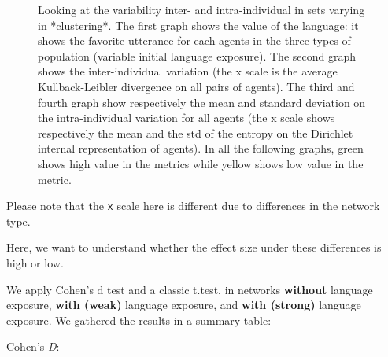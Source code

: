 \documentclass[
]{article}
\begin{document}
\begin{figure}[!H]
\caption{Looking at the variability inter- and intra-individual in sets varying in *clustering*. The first graph shows the value of the language: it shows the favorite utterance for each agents in the three types of population (variable initial language exposure). The second graph shows the  inter-individual variation (the x scale is the average Kullback-Leibler divergence on all pairs of agents). The third and fourth graph show respectively the mean and standard deviation on the intra-individual variation for all agents (the x scale shows respectively the mean and the std of the entropy on the Dirichlet internal representation of agents). In all the following graphs, green shows high value in the metrics while yellow shows low value in the metric.}\label{fig:unnamed-chunk-23}
\end{figure}

Please note that the \texttt{x} scale here is different due to
differences in the network type.

Here, we want to understand whether the effect size under these
differences is high or low.

We apply Cohen's d test and a classic t.test, in networks
\textbf{without} language exposure, \textbf{with (weak)} language
exposure, and \textbf{with (strong)} language exposure. We gathered the
results in a summary table:

Cohen's \emph{D}:
\end{document}
